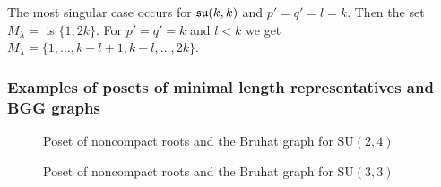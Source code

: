 \documentclass[12pt,a4paper,final]{report}
\begin{document}
The most singular case occurs for $\mathfrak{su}(k,k)$ and $p'=q'=l = k $. Then the set $M_\lambda =$ is $\{1,2k\}$. For $p'=q'=k$ and $l<k$ we get $M_\lambda = \{ 1,\ldots,k-l+1,k+l,\ldots, 2k \}$.

\subsubsection*{Examples of posets of minimal length representatives and BGG graphs}



\begin{figure}[H]
  \centering 
   
	 
  \caption{Poset of noncompact roots and the Bruhat graph for $\mathrm{SU}(2,4)$}
\end{figure} 

\begin{figure}[H]
  \centering 
	\resizebox{\textwidth}{!}{
   
	 
	}
  \caption{Poset of noncompact roots and the Bruhat graph for $\mathrm{SU}(3,3)$}
\end{figure} 
\end{document}
